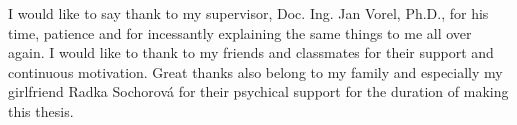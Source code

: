 \newpage\null \vfill \noindent\thispagestyle{empty}{\bf\Large
Acknowledgment}
\bigskip


I would like to say thank to my supervisor, Doc. Ing. Jan Vorel, Ph.D., for his time, patience and for incessantly explaining the same things to me all over again. I would like to thank to my friends and classmates for their support and continuous motivation. Great thanks also belong to my family and especially my girlfriend Radka Sochorová for their psychical support for the duration of making this thesis. 

\newpage

